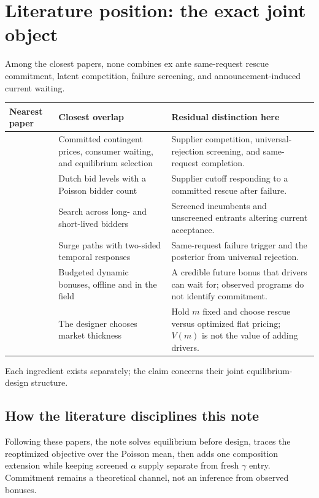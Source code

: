 \documentclass[11pt]{article}
\newcommand{\takeaway}[1]{\par\smallskip\noindent #1\par\smallskip}
\begin{document}
\clearpage
\section{Literature position: the exact joint object}

\takeaway{Among the closest papers, none combines ex ante same-request rescue
commitment, latent competition, failure screening, and announcement-induced
current waiting.}

\begin{center}
\scriptsize
\begin{tabularx}{\textwidth}{@{}L{2.5cm}L{5.2cm}X@{}}
\toprule
Nearest paper & Closest overlap & Residual distinction here\\
\midrule
\citet{CorreaEtAl2016} &
Committed contingent prices, consumer waiting, and equilibrium selection &
Supplier competition, universal-rejection screening, and same-request
completion.\\
\citet{LiKuo2013} &
Dutch bid levels with a Poisson bidder count &
Supplier cutoff responding to a committed rescue after failure.\\
\citet{LeeLi2023} &
Search across long- and short-lived bidders &
Screened incumbents and unscreened entrants altering current acceptance.\\
\citet{HuHuZhu2022} &
Surge paths with two-sided temporal responses &
Same-request failure trigger and the posterior from universal rejection.\\
\citet{WuEtAl2022} &
Budgeted dynamic bonuses, offline and in the field &
A credible future bonus that drivers can wait for; observed programs do not
identify commitment.\\
\citet{LoertscherMuirTaylor2022} &
The designer chooses market thickness &
Hold $m$ fixed and choose rescue versus optimized flat pricing; $V(m)$ is not
the value of adding drivers.\\
\bottomrule
\end{tabularx}
\end{center}

\noindent Each ingredient exists separately; the claim concerns their joint
equilibrium-design structure.

\subsection{How the literature disciplines this note}

Following these papers, the note solves equilibrium before design, traces the
reoptimized objective over the Poisson mean, then adds one composition
extension while keeping screened $\alpha$ supply separate from fresh $\gamma$
entry.  Commitment remains a theoretical channel, not an inference from
observed bonuses.
\end{document}
